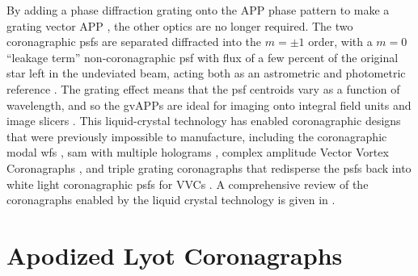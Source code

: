 \documentclass[letterpaper]{ar-1col}
\begin{document}
%
By adding a phase diffraction grating onto the APP phase pattern to make a grating vector APP \citep[gvAPP; ][]{Snik12,Otten14}, the other optics are no longer required.
%
The two coronagraphic \acp{psf} are separated diffracted into the $m=\pm 1$ order, with a $m=0$ ``leakage term'' non-coronagraphic \ac{psf} with flux of a few percent of the original star left in the undeviated beam, acting both as an astrometric and photometric reference \citep{Otten17,Sutlieff24}.
%
The grating effect means that the \ac{psf} centroids vary as a function of wavelength, and so the gvAPPs are ideal for imaging onto integral field units and image slicers \citep{Sutlieff21,Sutlieff23}.
%
This liquid-crystal technology has enabled coronagraphic designs that were previously impossible to manufacture, including the coronagraphic modal \ac{wfs} \citep{Wilby17}, \ac{sam} with multiple holograms \citep{Doelman21}, complex amplitude Vector Vortex Coronagraphs \citep[VVC; ][]{Snik14}, and triple grating coronagraphs \citep{Doelman20} that redisperse the \acp{psf} back into white light coronagraphic \acp{psf} for VVCs \citep{Doelman23,Laginga24}. 
%
A comprehensive review of the coronagraphs enabled by the liquid crystal technology is given in \citet{Doelman2021a}.

\section{Apodized Lyot Coronagraphs}\label{sec:nulled_lyot}
\end{document}
